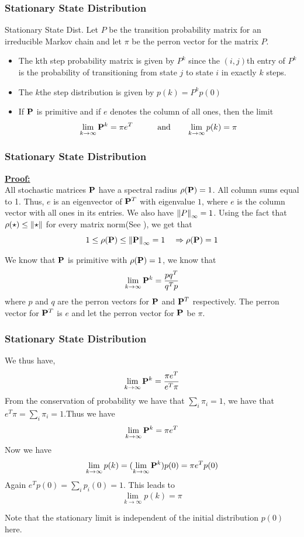 \documentclass[9pt]{beamer}
\newcommand{\PP}{\bold{P}}
\begin{document}
\begin{frame}
  \frametitle{Stationary State Distribution}
  \begin{block}{Stationary State Dist.}
  Let $P$ be the transition probability matrix for an irreducible Markov chain and 
  let $\pi$ be the perron vector for the matrix $P$. 
  \begin{itemize}
    \item The kth step probability matrix is given by
       $P^k$ since the $(i,j)$th entry of $P^k$ is the probability of transitioning from state $j$ to state $i$ in exactly $k$ steps.
    \item The $k$the step distribution is given by
      $p(k) = P^k p(0)$
      \item If $\PP$ is primitive and if $e$ denotes the column of all ones, then the limit
        $$\lim_{k \to \infty} \PP^k = \pi e^T \quad \quad \quad \text{and} \quad \quad
           \lim_{k \to \infty} p(k) = \pi$$ 

  \end{itemize}
  \end{block}


\end{frame}
\begin{frame}
  \frametitle{Stationary State Distribution}
  \underline{\textbf{Proof: }} \\ 
  All stochastic matrices $\PP$ have a spectral radius $\rho(\PP) =1$. All column sums equal to 
  1. Thus, $e$ is an eigenvector of $\PP^T$ with eigenvalue $1$, where $e$ is the column vector with 
  all ones in its entries. We also have $\norm{P}_{\infty} = 1$. Using the fact that $\rho(\star) \leq \norm{\star}$ for every matrix norm(See \cite{Meyer2000}),
  we get  that 
  $$ 1 \leq \rho(\PP) \leq \norm{\PP}_{\infty} = 1 ~~~ \Rightarrow \rho (\PP) =1$$

  We know that $\PP$ is primitive with $\rho(\PP) = 1$, we know that 
  $$ \lim_{k \to \infty} \PP^k = \frac{p q^T}{q^T p}  $$
  where $p$ and $q$ are the perron vectors for $\PP$ and $\PP^T$ respectively.
  The perron vector for $\PP^T$ is $e$ and let the perron vector for $\PP$ be $\pi$. 
  

\end{frame}
\begin{frame}
  \frametitle{Stationary State Distribution}

  We thus have,
  $$ \lim_{k \to \infty} \PP^k = \frac{\pi e^T}{e^T \pi}  $$
  From the conservation of probability we have that $\sum_i \pi_i =1$, we have that 
  $e^T\pi = \sum_i \pi_i = 1$.Thus we have 
  $$\lim_{k \to \infty} \PP^k = \pi e^T$$
  Now we have
  $$ \lim_{k \to \infty} p(k) = (\lim_{k \to \infty} \PP^k) p(0)= \pi e^Tp(0)$$
  Again $e^Tp(0) = \sum_i p_i(0) = 1$. This leads to 
  $$  \lim_{k \to \infty} p(k) = \pi $$

  Note that the stationary limit is independent of the initial distribution $p(0)$ here.

\end{frame}
\end{document}
